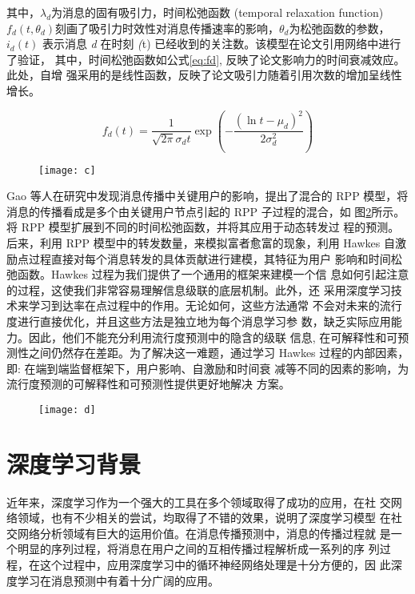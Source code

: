 其中，$\lambda_d$为消息的固有吸引力，时间松弛函数 (temporal relaxation function)  $f_d(t,\theta_d)$刻画了吸引力时效性对消息传播速率的影响，$\theta_d$为松弛函数的参数，$i_d(t)$
表示消息 \textit{d} 在时刻 \textit(t) 已经收到的关注数。该模型在论文引用网络中进行了验证， 其中，时间松弛函数如公式\ref{eq:fd}, 反映了论文影响力的时间衰减效应。此处，自增 强采用的是线性函数，反映了论文吸引力随着引用次数的增加呈线性增长。

\begin{equation}\label{eq:fd}
f_d(t) = \frac{1}{\sqrt{2\pi}  \sigma_dt}\exp(-\frac{(\ln t - \mu_d )^2}{2\sigma_d^2})
\end{equation}

\begin{figure}[H]
    \centering
    \texttt{[image: c]}
    \label{fig:c}
\end{figure}


Gao 等人\citep{Gao2016Modeling}在研究中发现消息传播中关键用户的影响，提出了混合的 RPP 模型，将消息的传播看成是多个由关键用户节点引起的 RPP 子过程的混合，如 图\ref{fig:d}所示。将 RPP 模型扩展到不同的时间松弛函数，并将其应用于动态转发过 程的预测。后来，利用 RPP 模型中的转发数量，来模拟富者愈富的现象，利用 Hawkes 自激励点过程直接对每个消息转发的具体贡献进行建模，其特征为用户 影响和时间松弛函数。Hawkes 过程为我们提供了一个通用的框架来建模一个信 息如何引起注意的过程，这使我们非常容易理解信息级联的底层机制。此外，还 采用深度学习技术来学习到达率在点过程中的作用。无论如何，这些方法通常 不会对未来的流行度进行直接优化，并且这些方法是独立地为每个消息学习参 数，缺乏实际应用能力。因此，他们不能充分利用流行度预测中的隐含的级联 信息, 在可解释性和可预测性之间仍然存在差距。为了解决这一难题，通过学习 Hawkes 过程的内部因素，即: 在端到端监督框架下，用户影响、自激励和时间衰 减等不同的因素的影响，为流行度预测的可解释性和可预测性提供更好地解决 方案。

\begin{figure}[!htbp]
    \centering
    \texttt{[image: d]}
    \label{fig:d}
\end{figure}

\section{深度学习背景}
近年来，深度学习作为一个强大的工具在多个领域取得了成功的应用，在社 交网络领域，也有不少相关的尝试，均取得了不错的效果，说明了深度学习模型 在社交网络分析领域有巨大的运用价值。在消息传播预测中，消息的传播过程就 是一个明显的序列过程，将消息在用户之间的互相传播过程解析成一系列的序 列过程，在这个过程中，应用深度学习中的循环神经网络处理是十分方便的，因 此深度学习在消息预测中有着十分广阔的应用。
